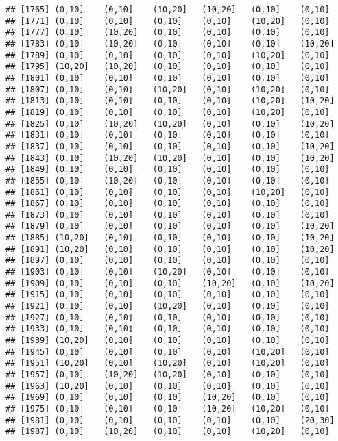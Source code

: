 \documentclass[]{article}
\begin{document}
\begin{verbatim}
## [1765] (0,10]    (0,10]    (10,20]   (10,20]   (0,10]    (0,10]   
## [1771] (0,10]    (0,10]    (0,10]    (0,10]    (10,20]   (0,10]   
## [1777] (0,10]    (10,20]   (0,10]    (0,10]    (0,10]    (0,10]   
## [1783] (0,10]    (10,20]   (0,10]    (0,10]    (0,10]    (10,20]  
## [1789] (0,10]    (0,10]    (0,10]    (0,10]    (10,20]   (0,10]   
## [1795] (10,20]   (10,20]   (0,10]    (0,10]    (0,10]    (0,10]   
## [1801] (0,10]    (0,10]    (0,10]    (0,10]    (0,10]    (0,10]   
## [1807] (0,10]    (0,10]    (10,20]   (0,10]    (10,20]   (0,10]   
## [1813] (0,10]    (0,10]    (0,10]    (0,10]    (10,20]   (10,20]  
## [1819] (0,10]    (0,10]    (0,10]    (0,10]    (10,20]   (0,10]   
## [1825] (0,10]    (10,20]   (10,20]   (0,10]    (0,10]    (10,20]  
## [1831] (0,10]    (0,10]    (0,10]    (0,10]    (0,10]    (0,10]   
## [1837] (0,10]    (0,10]    (0,10]    (0,10]    (0,10]    (10,20]  
## [1843] (0,10]    (10,20]   (10,20]   (0,10]    (0,10]    (10,20]  
## [1849] (0,10]    (0,10]    (0,10]    (0,10]    (0,10]    (0,10]   
## [1855] (0,10]    (10,20]   (0,10]    (0,10]    (0,10]    (0,10]   
## [1861] (0,10]    (0,10]    (0,10]    (0,10]    (10,20]   (0,10]   
## [1867] (0,10]    (0,10]    (0,10]    (0,10]    (0,10]    (0,10]   
## [1873] (0,10]    (0,10]    (0,10]    (0,10]    (0,10]    (0,10]   
## [1879] (0,10]    (0,10]    (0,10]    (0,10]    (0,10]    (10,20]  
## [1885] (10,20]   (0,10]    (0,10]    (0,10]    (0,10]    (10,20]  
## [1891] (10,20]   (0,10]    (0,10]    (0,10]    (0,10]    (10,20]  
## [1897] (0,10]    (0,10]    (0,10]    (0,10]    (0,10]    (0,10]   
## [1903] (0,10]    (0,10]    (10,20]   (0,10]    (0,10]    (0,10]   
## [1909] (0,10]    (0,10]    (0,10]    (10,20]   (0,10]    (10,20]  
## [1915] (0,10]    (0,10]    (0,10]    (0,10]    (0,10]    (0,10]   
## [1921] (0,10]    (0,10]    (10,20]   (0,10]    (0,10]    (0,10]   
## [1927] (0,10]    (0,10]    (0,10]    (0,10]    (0,10]    (0,10]   
## [1933] (0,10]    (0,10]    (0,10]    (0,10]    (0,10]    (0,10]   
## [1939] (10,20]   (0,10]    (0,10]    (0,10]    (0,10]    (0,10]   
## [1945] (0,10]    (0,10]    (0,10]    (0,10]    (10,20]   (0,10]   
## [1951] (10,20]   (0,10]    (10,20]   (0,10]    (10,20]   (0,10]   
## [1957] (0,10]    (10,20]   (10,20]   (0,10]    (0,10]    (0,10]   
## [1963] (10,20]   (0,10]    (0,10]    (0,10]    (0,10]    (0,10]   
## [1969] (0,10]    (0,10]    (0,10]    (10,20]   (0,10]    (0,10]   
## [1975] (0,10]    (0,10]    (0,10]    (10,20]   (10,20]   (0,10]   
## [1981] (0,10]    (0,10]    (0,10]    (0,10]    (0,10]    (20,30]  
## [1987] (0,10]    (10,20]   (0,10]    (0,10]    (10,20]   (0,10]   

\end{verbatim}
\end{document}
